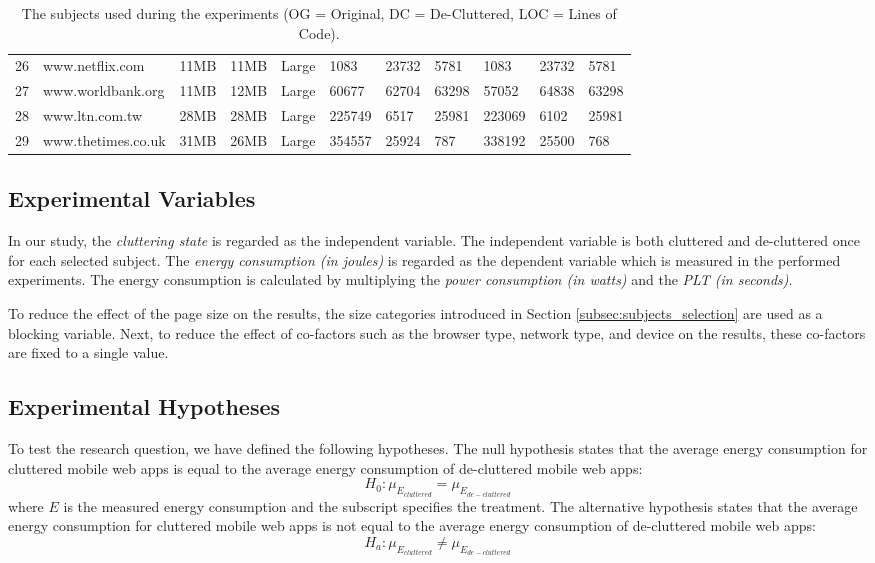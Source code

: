 \begin{table*}[t]
{\begin{tabular}{|l|ll|l|l|lll|lll|}
26 &         www.netflix.com &           11MB &            11MB &    Large &      1083 &       23732 &       5781 &      1083 &       23732 &       5781 \\
27 &       www.worldbank.org &           11MB &            12MB &    Large &     60677 &       62704 &      63298 &     57052 &       64838 &      63298 \\
28 &          www.ltn.com.tw &           28MB &            28MB &    Large &    225749 &        6517 &      25981 &    223069 &        6102 &      25981 \\
29 &      www.thetimes.co.uk &           31MB &            26MB &    Large &    354557 &       25924 &        787 &    338192 &       25500 &        768 \\
\bottomrule
\end{tabular}
}

\caption{The subjects used during the experiments (OG = Original, DC = De-Cluttered, LOC = Lines of Code).}
\label{tab:sample_of_subject}
\end{table*}



\subsection{Experimental Variables}

In our study, the \textit{cluttering state} is regarded as the independent variable. The independent variable is both cluttered and de-cluttered once for each selected subject. The \textit{energy consumption (in joules)} is regarded as the dependent variable which is measured in the performed experiments. The energy consumption is calculated by multiplying the \textit{power consumption (in watts)} and the \textit{PLT (in seconds)}.

To reduce the effect of the page size on the results, the size categories introduced in Section \ref{subsec:subjects_selection} are used as a blocking variable. Next, to reduce the effect of co-factors such as the browser type, network type, and device on the results, these co-factors are fixed to a single value. 


\subsection{Experimental Hypotheses}

To test the research question, we have defined the following hypotheses. The null hypothesis states that the average energy consumption for cluttered mobile web apps is equal to the average energy consumption of de-cluttered mobile web apps:
$$H_0: \mu_{E_{cluttered}} = \mu_{E_{de-cluttered}}$$
where $E$ is the measured energy consumption and the subscript specifies the treatment.
The alternative hypothesis states that the average energy consumption for cluttered mobile web apps is not equal to the average energy consumption of de-cluttered mobile web apps:
$$H_a: \mu_{E_{cluttered}} \neq \mu_{E_{de-cluttered}}$$


